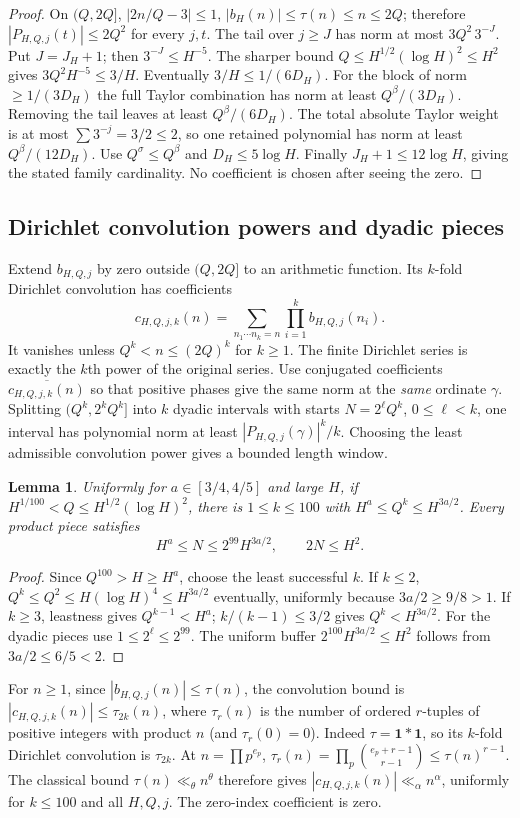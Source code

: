 \documentclass[11pt,a4paper,oneside]{article}
\newtheorem{lemma}[theorem]{Lemma}
\theoremstyle{definition}
\newcommand{\one}{\mathbf 1}
\numberwithin{equation}{section}
\begin{document}
\begin{proof}
On $(Q,2Q]$, $|2n/Q-3|\le1$, $|b_H(n)|\le \tau(n)\le n\le2Q$;
therefore $|P_{H,Q,j}(t)|\le2Q^2$ for every $j,t$.
The tail over $j\ge J$ has norm at most $3Q^2\,3^{-J}$. Put $J=J_H+1$; then $3^{-J}\le H^{-5}$. The sharper bound $Q\le H^{1/2}(\log H)^2\le H^2$ gives $3Q^2H^{-5}\le3/H$. Eventually $3/H\le1/(6D_H)$.
For the block of norm $\ge1/(3D_H)$ the full Taylor combination has
norm at least $Q^\beta/(3D_H)$. Removing the tail leaves at least
$Q^\beta/(6D_H)$. The total absolute Taylor weight is at most
$\sum3^{-j}=3/2\le2$, so one retained polynomial has norm at least
$Q^\beta/(12D_H)$. Use $Q^\sigma\le Q^\beta$ and
$D_H\le5\log H$. Finally $J_H+1\le12\log H$, giving the stated family
cardinality. No coefficient is chosen after seeing the zero.
\end{proof}
\subsection{Dirichlet convolution powers and dyadic pieces}
Extend $b_{H,Q,j}$ by zero outside $(Q,2Q]$ to an arithmetic function.
Its $k$-fold Dirichlet convolution has coefficients
\[
 c_{H,Q,j,k}(n)=\sum_{n_1\cdots n_k=n}\prod_{i=1}^k b_{H,Q,j}(n_i).
\]
It vanishes unless $Q^k<n\le(2Q)^k$ for $k\ge1$.
The finite Dirichlet series is exactly the $k$th power of the original
series. Use conjugated coefficients $\overline{c_{H,Q,j,k}(n)}$ so that
positive phases give the same norm at the \emph{same} ordinate $\gamma$.
Splitting $(Q^k,2^kQ^k]$ into $k$ dyadic intervals with starts
$N=2^\ell Q^k$, $0\le\ell<k$, one interval has polynomial norm at least
$|P_{H,Q,j}(\gamma)|^k/k$.
Choosing the least admissible convolution power gives a bounded length window.
\begin{lemma}
Uniformly for $a\in[3/4,4/5]$ and large $H$, if
$H^{1/100}<Q\le H^{1/2}(\log H)^2$, there is $1\le k\le100$ with
$H^a\le Q^k\le H^{3a/2}$. Every product piece satisfies
\[
 H^a\le N\le2^{99}H^{3a/2},\qquad2N\le H^2.
\]
\end{lemma}
\begin{proof}
Since $Q^{100}>H\ge H^a$, choose the least successful $k$. If $k\le2$,
$Q^k\le Q^2\le H(\log H)^4\le H^{3a/2}$ eventually, uniformly because
$3a/2\ge9/8>1$. If $k\ge3$, leastness gives $Q^{k-1}<H^a$;
$k/(k-1)\le3/2$ gives $Q^k<H^{3a/2}$. For the dyadic pieces use
$1\le2^\ell\le2^{99}$. The uniform buffer
$2^{100}H^{3a/2}\le H^2$ follows from $3a/2\le6/5<2$.
\end{proof}
For $n\ge1$, since $|b_{H,Q,j}(n)|\le\tau(n)$, the convolution bound is $|c_{H,Q,j,k}(n)|\le\tau_{2k}(n)$, where $\tau_r(n)$ is the number of ordered $r$-tuples of positive integers with product $n$ (and $\tau_r(0)=0$). Indeed $\tau=\one*\one$, so its $k$-fold Dirichlet convolution is $\tau_{2k}$. At $n=\prod p^{e_p}$, $\tau_r(n)=\prod_p\binom{e_p+r-1}{r-1}\le\tau(n)^{r-1}$. The classical bound $\tau(n)\ll_\theta n^\theta$ therefore gives $|c_{H,Q,j,k}(n)|\ll_\alpha n^\alpha$, uniformly for $k\le100$ and all $H,Q,j$. The zero-index coefficient is zero.
\end{document}
